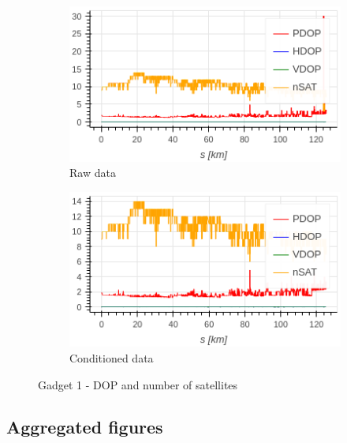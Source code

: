 \documentclass{article}
\begin{document}
			\begin{figure}[h]
		    	\centering
		     	\begin{subfigure}[b]{0.45\textwidth}
		      		\centering
		      	   \includegraphics[width=\textwidth]{raw_dop_1.png}
		      	   \caption{Raw data}
		      	   \label{fig:Gadget1_raw_dop}
		     	\end{subfigure}
		     	\begin{subfigure}[b]{0.45\textwidth}
		      	   \centering
		      	   \includegraphics[width=\textwidth]{cond_dop_1.png}
		      	   \caption{Conditioned data}
		      	   \label{fig:Gadget1_cond_dop}
		     	\end{subfigure}
		      \caption{Gadget 1 - DOP and number of satellites}
		      \label{fig:Gadget1_dop}
			\end{figure}
		\subsection{Aggregated figures}
\end{document}
